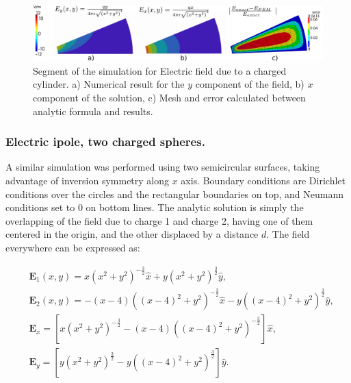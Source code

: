 \begin{figure}
\centering
\includegraphics[scale=0.2]{./img/Eight_of_cylinder.pdf}
\caption{Segment of the simulation for Electric field due to a charged cylinder. a) Numerical result for the $y$ component of the field, b) $x$ component of the solution, c) Mesh and error calculated between analytic formula and results.}
\label{fig:eight_of_cylinder}
\end{figure}

\subsubsection{Electric ipole, two charged spheres.}

A similar simulation was performed using two semicircular surfaces, taking advantage of inversion symmetry along $x$ axis. Boundary conditions are Dirichlet conditions over the circles and the rectangular boundaries on top, and Neumann conditions set to 0 on bottom lines.  The analytic solution is simply the overlapping of the field due to charge 1 and charge 2, having one of them centered in the origin, and the other displaced by a distance $d$. The field everywhere can be expressed as: 

\begin{align}
&\mathbf{E}_1(x,y)=x\left(x^2+y^2\right)^{-\frac{3}{2}}\hat{x} + y\left(x^2+y^2\right)^{\frac{3}{2}}\hat{y},\\ 
&\mathbf{E}_2(x,y)=-(x-4)\left((x-4)^2+y^2\right)^{-\frac{3}{2}} \hat{x}-y\left((x-4)^2+y^2\right)^{\frac{3}{2}}\hat{y},\\
&\mathbf{E}_x = \left[ x\left(x^2+y^2\right)^{-\frac{3}{2}} -(x-4)\left((x-4)^2+y^2\right)^{-\frac{3}{2}}\right] \hat{x},\\
&\mathbf{E}_y =\left[ y\left(x^2+y^2\right)^{\frac{3}{2}} -y\left((x-4)^2+y^2\right)^{\frac{3}{2}}\right]\hat{y}.
\end{align}

